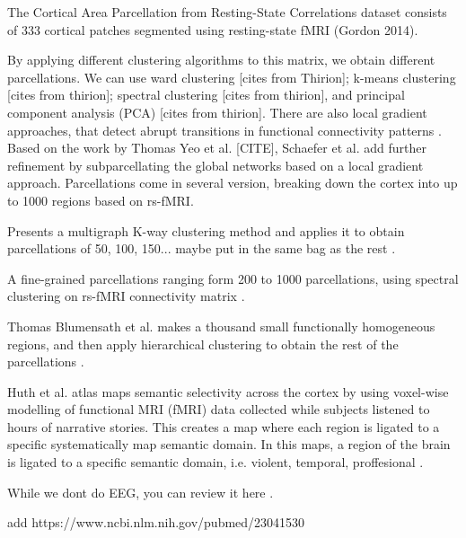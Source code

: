 The Cortical Area Parcellation from Resting-State Correlations dataset consists
of 333 cortical patches segmented using resting-state fMRI (Gordon 2014).

By applying different clustering algorithms to this matrix, we
obtain different parcellations. We can use ward clustering [cites from Thirion];
k-means clustering [cites from thirion]; spectral clustering [cites from thirion],
and principal component analysis (PCA) [cites from thirion]. There are also
local gradient approaches, that detect abrupt transitions in functional
connectivity patterns \cite{Wig2014, Schaefer2017}. 
Based on the work by Thomas Yeo et al. [CITE], Schaefer et al.  \cite{Schaefer2017}
add further refinement by subparcellating the global networks based on a local
gradient approach. Parcellations come in several version, breaking down the cortex
into up to 1000 regions based on rs-fMRI.

Presents a multigraph K-way clustering method and applies it to obtain 
parcellations of 50, 100, 150... maybe put in the same bag as the rest \cite{Shen2013}.


A fine-grained parcellations ranging form 200 to 1000 parcellations,
using spectral clustering on rs-fMRI connectivity matrix \cite{Craddock2011}.

Thomas Blumensath et al. makes a thousand small functionally homogeneous regions,
and then apply hierarchical clustering to obtain the rest of the parcellations \cite{Blumensath2013}.

Huth et al. atlas \cite{Huth2016} maps semantic selectivity across the cortex
by using voxel-wise modelling of functional MRI (fMRI) data collected while 
subjects listened to hours of narrative stories. This creates a map where each
region is ligated to a specific systematically map semantic domain. In this
maps, a region of the brain is ligated to a specific semantic domain, i.e.
violent, temporal, proffesional \cite{Huth2016}.

While we dont do EEG, you can review it here \cite{Shen2013}.

add \cite{Ryali2013} https://www.ncbi.nlm.nih.gov/pubmed/23041530



